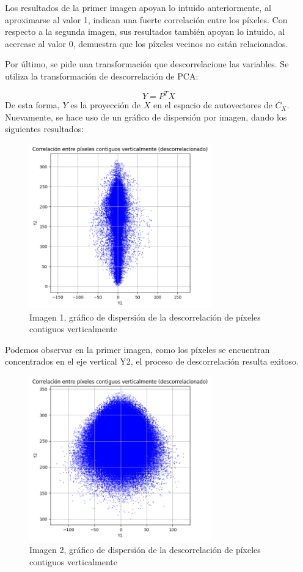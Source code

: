 \documentclass[a4paper,12pt]{article}
\begin{document}
Los resultados de la primer imagen apoyan lo intuido anteriormente, al aproximarse al valor 1, indican una fuerte correlación entre los píxeles.
Con respecto a la segunda imagen, sus resultados también apoyan lo intuido, al acercase al valor 0, demuestra que los píxeles vecinos no están relacionados.

Por último, se pide una transformación que descorrelacione las variables.
Se utiliza la transformación de descorrelación de PCA:

\[
Y = P^T X
\]
De esta forma, \(Y\) es la proyección de \(X\) en el espacio de autovectores de \(C_X\).
\\
Nuevamente, se hace uso de un gráfico de dispersión por imagen, dando los siguientes resultados:

\begin{figure}[H]
    \centering
    \includegraphics[width=0.7\textwidth]{Ejercicio1c.png}
    \caption{Imagen 1, gráfico de dispersión de la descorrelación de píxeles contiguos verticalmente}
    \label{fig:descorrelacion1}
\end{figure}

Podemos observar en la primer imagen, como los píxeles se encuentran concentrados en el eje vertical Y2, el proceso de descorrelación resulta exitoso.

\begin{figure}[H]
    \centering
    \includegraphics[width=0.7\textwidth]{Ejercicio1d.png}
    \caption{Imagen 2, gráfico de dispersión de la descorrelación de píxeles contiguos verticalmente}
    \label{fig:descorrelacion2}
\end{figure}
\end{document}
